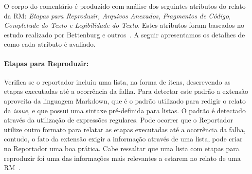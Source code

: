 \begin{table}[htpb]
\centering
{}
\caption{Critérios de aceitação e forma de análise utilizados na análise de
    qualidade do relato.}
\label{tab:criterios_analise_qualidade_relato}
\end{table}

O corpo do comentário é produzido com análise dos seguintes atributos do relato
da RM\@: \textit{Etapas para Reproduzir, Arquivos Anexados, Fragmentos de
    Código, Completude do Texto e Legibilidade do Texto}. Estes atributos foram
baseados no estudo realizado por Bettenburg e outros~\cite{bettenburg2008makes}.
A seguir apresentamos os detalhes de como cada atributo é avaliado.

\paragraph{Etapas para Reproduzir:}
\label{par:etapas_para_reproduzir_}

Verifica se o reportador incluiu uma lista, na forma de itens, descrevendo as
etapas executadas até a ocorrência da falha. Para detectar este padrão a
extensão aproveita da linguagem Markdown, que é o padrão utilizado para redigir
o relato da \textit{issue}, e que possui uma sintaxe pré-definida para listas. O
padrão é detectado através da utilização de expressões regulares. Pode ocorrer
que o Reportador utilize outro formato para relatar as etapas executadas até a
ocorrência da falha, contudo, o fato da extensão exigir a informação através de
uma lista, pode criar no Reportador uma boa prática. Cabe ressaltar que uma
lista com etapas para reproduzir foi uma das informações mais relevantes a
estarem no relato de uma RM~\cite{bettenburg2008makes}.

